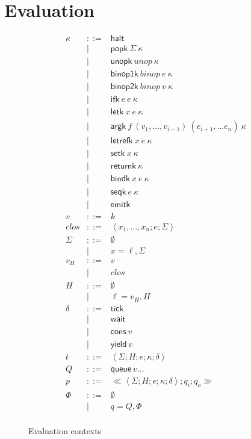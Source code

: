 \documentclass[twocolumn]{article}
\newcommand{\bnfdef}{::=}
\newcommand{\bnfalt}{\mathrel{\mid}}
\newcommand{\kw}[1]{\textsf{#1}}
\newcommand{\clos}[3]{\left<#1; #2; #3\right>}
\newcommand{\thread}[5]{\left<#1; #2; #3; #4; #5\right>}
\newcommand{\proc}[3]{\ll\!#1; #2; #3\!\gg}
\begin{document}
\section{Evaluation}

\begin{figure}
\begin{equation*}
\begin{array}{lcl}
  \kappa
     & \bnfdef & \kw{halt} \\
     & \bnfalt & \kw{popk}~ \Sigma~ \kappa \\
     & \bnfalt & \kw{unopk}~ unop~ \kappa \\
     & \bnfalt & \kw{binop1k}~ binop~ e~ \kappa \\
     & \bnfalt & \kw{binop2k}~ binop~ v~ \kappa  \\
     & \bnfalt & \kw{ifk}~ e~ e~ \kappa \\
     & \bnfalt & \kw{letk}~ x~ e~ \kappa \\
     & \bnfalt & \kw{argk}~ f~ (v_1, \ldots, v_{i-1})~ (e_{i+1}, \ldots e_n)~ \kappa \\
     & \bnfalt & \kw{letrefk}~ x~ e~ \kappa \\
     & \bnfalt & \kw{setk}~ x~ \kappa \\
     & \bnfalt & \kw{returnk}~ \kappa \\
     & \bnfalt & \kw{bindk}~ x~ e~ \kappa \\
     & \bnfalt & \kw{seqk}~ e~ \kappa \\
     & \bnfalt & \kw{emitk} \\
  v
     & \bnfdef & k \\
  clos
     & \bnfdef & \clos{x_1, \ldots, x_n}{e}{\Sigma} \\
  \Sigma
     & \bnfdef & \emptyset \\
     & \bnfalt & x = \ell, \Sigma \\
  v_H
     & \bnfdef & v \\
     & \bnfalt & clos \\
  H
     & \bnfdef & \emptyset \\
     & \bnfalt & \ell = v_H, H \\
  \delta
     & \bnfdef & \kw{tick} \\
     & \bnfalt & \kw{wait} \\
     & \bnfalt & \kw{cons}~ v \\
     & \bnfalt & \kw{yield}~ v \\
  t
     & \bnfdef & \thread{\Sigma}{H}{e}{\kappa}{\delta} \\
  Q
     & \bnfdef & \kw{queue}~ v \ldots \\
  p
     & \bnfdef & \proc{\thread{\Sigma}{H}{e}{\kappa}{\delta}}{q_i}{q_o} \\
  \Phi
     & \bnfdef & \emptyset \\
     & \bnfalt & q = Q, \Phi \\
\end{array}
\end{equation*}
\caption{Evaluation contexts}
\label{fig:lang:context}
\end{figure}
\end{document}
